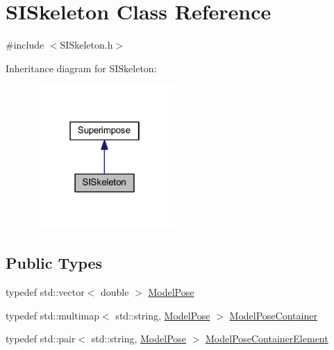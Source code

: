 \hypertarget{classSISkeleton}{}\section{S\+I\+Skeleton Class Reference}
\label{classSISkeleton}


{\ttfamily \#include $<$S\+I\+Skeleton.\+h$>$}



Inheritance diagram for S\+I\+Skeleton\+:
\nopagebreak
\begin{figure}[H]
\begin{center}
\leavevmode
\includegraphics[width=154pt]{classSISkeleton__inherit__graph}
\end{center}
\end{figure}
\subsection*{Public Types}
\begin{DoxyCompactItemize}
\item 
typedef std\+::vector$<$ double $>$ \mbox{\hyperlink{classSuperimpose_a85d40a5caf19f486d1e0c15c0a025378}{Model\+Pose}}
\item 
typedef std\+::multimap$<$ std\+::string, \mbox{\hyperlink{classSuperimpose_a85d40a5caf19f486d1e0c15c0a025378}{Model\+Pose}} $>$ \mbox{\hyperlink{classSuperimpose_a178e3d4e2def6635bfcf9454dd4b5d22}{Model\+Pose\+Container}}
\item 
typedef std\+::pair$<$ std\+::string, \mbox{\hyperlink{classSuperimpose_a85d40a5caf19f486d1e0c15c0a025378}{Model\+Pose}} $>$ \mbox{\hyperlink{classSuperimpose_a1e02e0225687b42296dcfee4eadf8a55}{Model\+Pose\+Container\+Element}}
\end{DoxyCompactItemize}
